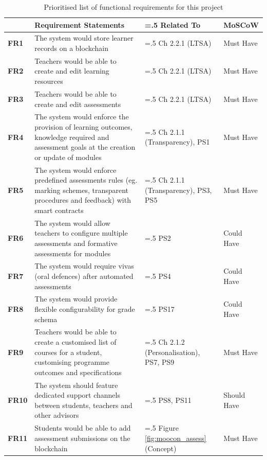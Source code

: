 \begin{table}[!h] 
    \caption{Prioritised list of functional requirements for this project}
    \centering
    \label{table:fx-reqs}
    \begin{tabularx}{\textwidth}{>{\bfseries}l>{\hsize=1.5\hsize}X>{\hsize=.5\hsize}Xl}
        & Requirement Statements & Related To & MoSCoW\\
        \toprule
        FR1 & The system would store learner records on a blockchain 
        & Ch 2.2.1 (LTSA) & Must Have
        \\\midrule
        FR2 & Teachers would be able to create and edit learning resources
        & Ch 2.2.1 (LTSA) & Must Have
        \\\midrule
        FR3 & Teachers would be able to create and edit assessments
        & Ch 2.2.1 (LTSA) & Must Have
        \\\midrule
        FR4 & The system would enforce the provision of learning outcomes, knowledge required 
        and assessment goals at the creation or update of modules & Ch 2.1.1 (Transparency), 
        PS1 & Must Have
        \\\midrule
        FR5 & The system would enforce predefined assessments rules (eg. marking schemes, 
        transparent procedures and feedback) with smart contracts 
        & Ch 2.1.1 (Transparency), PS3, PS5 & Must Have
        \\\midrule
        FR6 & The system would allow teachers to configure multiple assessments and 
        formative assessments for modules & PS2 & Could Have
        \\\midrule
        FR7 & The system would require vivas (oral defences) after automated assessments & 
        PS4 & Could Have
        \\\midrule
        FR8 & The system would provide flexible configurability for grade schema & PS17
        & Could Have
        \\\midrule
        FR9 & Teachers would be able to create a customised list of courses 
        for a student, customising programme outcomes and specifications 
        & Ch 2.1.2 (Personalisation), PS7, PS9 & Must Have
        \\\midrule
        FR10 & The system should feature dedicated support channels between students, teachers 
        and other advisors 
        & PS8, PS11 & Should Have
        \\\midrule
        FR11 & Students would be able to add assessment submissions on the blockchain 
        & Figure \ref{fig:moocon_assess} (Concept)& Must Have

\end{tabularx}
\end{table}
